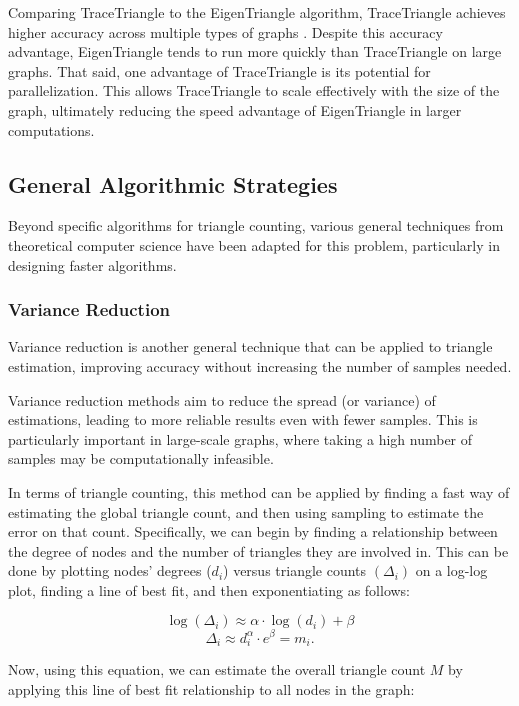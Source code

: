 \documentclass[11pt]{article}
\begin{document}
Comparing TraceTriangle to the EigenTriangle algorithm, TraceTriangle achieves higher accuracy across multiple types of graphs \cite{avron_counting_2010}.
Despite this accuracy advantage, EigenTriangle tends to run more quickly than TraceTriangle on large graphs.
That said, one advantage of TraceTriangle is its potential for parallelization.
This allows TraceTriangle to scale effectively with the size of the graph, ultimately reducing the speed advantage of EigenTriangle in larger computations.

\subsection{General Algorithmic Strategies}

Beyond specific algorithms for triangle counting, various general techniques from theoretical computer science have been adapted for this problem, particularly in designing faster algorithms.

\subsubsection{Variance Reduction}

Variance reduction \cite{prescott_monte_1965} is another general technique that can be applied to triangle estimation, improving accuracy without increasing the number of samples needed.

Variance reduction methods aim to reduce the spread (or variance) of estimations, leading to more reliable results even with fewer samples.
This is particularly important in large-scale graphs, where taking a high number of samples may be computationally infeasible.

In terms of triangle counting, this method can be applied by finding a fast way of estimating the global triangle count, and then using sampling to estimate the error on that count.
Specifically, we can begin by finding a relationship between the degree of nodes and the number of triangles they are involved in.
This can be done by plotting nodes' degrees ($d_i$) versus triangle counts $(\Delta_i)$ on a log-log plot, finding a line of best fit, and then exponentiating as follows:

\[
\log(\Delta_i) \approx \alpha \cdot \log(d_i) + \beta
\]
\[
\Delta_i \approx d_i^\alpha \cdot e^\beta = m_i.
\]

Now, using this equation, we can estimate the overall triangle count $M$ by applying this line of best fit relationship to all nodes in the graph:
\end{document}
